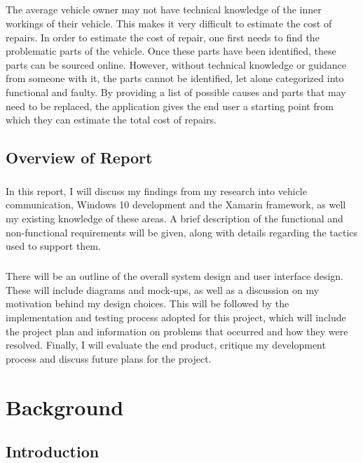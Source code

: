 \documentclass[12pt]{report}
\begin{document}
		\paragraph{}
		{
		The average vehicle owner may not have technical knowledge of the inner workings of their vehicle. This makes it very difficult to estimate the cost of repairs. In order to estimate the cost of repair, one first needs to find the problematic parts of the vehicle. Once these parts have been identified, these parts can be sourced online. However, without technical knowledge or guidance from someone with it, the parts cannot be identified, let alone categorized into functional and faulty. By providing a list of possible causes and parts that may need to be replaced, the application gives the end user a starting point from which they can estimate the total cost of repairs. 
		}
		\section{Overview of Report}
			\paragraph{}{
			In this report, I will discuss my findings from my research into vehicle communication, Windows 10 development and the Xamarin framework, as well my existing knowledge of these areas. A brief description of the functional and non-functional requirements will be given, along with details regarding the tactics used to support them. 
			}
			\paragraph{}{
			There will be an outline of the overall system design and user interface design. These will include diagrams and mock-ups, as well as a discussion on my motivation behind my design choices. This will be followed by the implementation and testing process adopted for this project, which will include the project plan and information on problems that occurred and how they were resolved. Finally, I will evaluate the end product, critique my development process and discuss future plans for the project.
			}
	\newpage
	
	\chapter{Background}
		\section{Introduction}
\end{document}
